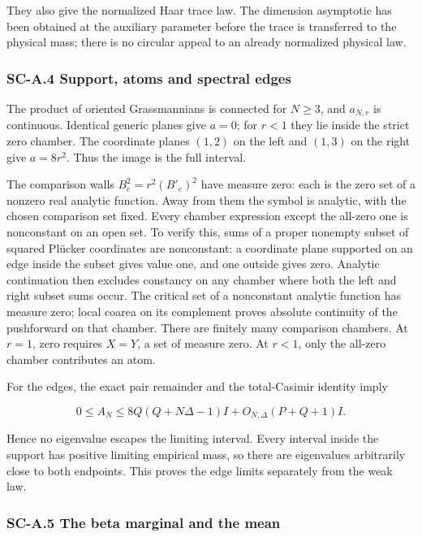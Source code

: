 They also give the normalized Haar trace law. The dimension asymptotic has been obtained at the auxiliary parameter before the trace is transferred to the physical mass; there is no circular appeal to an already normalized physical law.

\hypertarget{sc-a.4-support-atoms-and-spectral-edges}{%
\subsubsection{SC-A.4 Support, atoms and spectral edges}\label{sc-a.4-support-atoms-and-spectral-edges}}

The product of oriented Grassmannians is connected for \(N\geq3\), and \(a_{N,r}\) is continuous. Identical generic planes give \(a=0\); for \(r<1\) they lie inside the strict zero chamber. The coordinate planes \((1,2)\) on the left and \((1,3)\) on the right give \(a=8r^2\). Thus the image is the full interval.

The comparison walls \(B_e^2=r^2(B'_e)^2\) have measure zero: each is the zero set of a nonzero real analytic function. Away from them the symbol is analytic, with the chosen comparison set fixed. Every chamber expression except the all-zero one is nonconstant on an open set. To verify this, sums of a proper nonempty subset of squared Plücker coordinates are nonconstant: a coordinate plane supported on an edge inside the subset gives value one, and one outside gives zero. Analytic continuation then excludes constancy on any chamber where both the left and right subset sums occur. The critical set of a nonconstant analytic function has measure zero; local coarea on its complement proves absolute continuity of the pushforward on that chamber. There are finitely many comparison chambers. At \(r=1\), zero requires \(X=Y\), a set of measure zero. At \(r<1\), only the all-zero chamber contributes an atom.

For the edges, the exact pair remainder and the total-Casimir identity imply

\[
0\leq A_N\leq 8Q(Q+N\Delta-1)I+O_{N,\Delta}(P+Q+1)I.
\]

Hence no eigenvalue escapes the limiting interval. Every interval inside the support has positive limiting empirical mass, so there are eigenvalues arbitrarily close to both endpoints. This proves the edge limits separately from the weak law.

\hypertarget{sc-a.5-the-beta-marginal-and-the-mean}{%
\subsubsection{SC-A.5 The beta marginal and the mean}\label{sc-a.5-the-beta-marginal-and-the-mean}}

